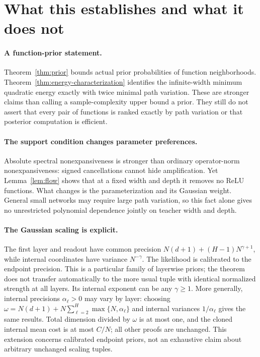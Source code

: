 \section{What this establishes and what it does not}
\paragraph{A function-prior statement.}
Theorem~\ref{thm:prior} bounds actual prior probabilities of function neighborhoods. Theorem~\ref{thm:energy-characterization} identifies the infinite-width minimum quadratic energy exactly with twice minimal path variation. These are stronger claims than calling a sample-complexity upper bound a prior. They still do not assert that every pair of functions is ranked exactly by path variation or that posterior computation is efficient.

\paragraph{The support condition changes parameter preferences.}
Absolute spectral nonexpansiveness is stronger than ordinary operator-norm nonexpansiveness: signed cancellations cannot hide amplification. Yet Lemma~\ref{lem:flow} shows that at a fixed width and depth it removes no ReLU functions. What changes is the parameterization and its Gaussian weight. General small networks may require large path variation, so this fact alone gives no unrestricted polynomial dependence jointly on teacher width and depth.

\paragraph{The Gaussian scaling is explicit.}
The first layer and readout have common precision $N(d+1)+(H-1)N^{\gamma+1}$, while internal coordinates have variance $N^{-\gamma}$. The likelihood is calibrated to the endpoint precision. This is a particular family of layerwise priors; the theorem does not transfer automatically to the more usual tuple with identical normalized strength at all layers. Its internal exponent can be any $\gamma\ge1$. More generally, internal precisions $\alpha_\ell>0$ may vary by layer: choosing $\omega=N(d+1)+N\sum_{\ell=2}^H\max\{N,\alpha_\ell\}$ and internal variances $1/\alpha_\ell$ gives the same results. Total dimension divided by $\omega$ is at most one, and the cloned internal mean cost is at most $C/N$; all other proofs are unchanged. This extension concerns calibrated endpoint priors, not an exhaustive claim about arbitrary unchanged scaling tuples.

